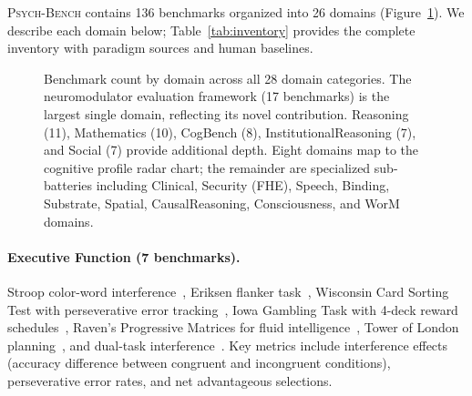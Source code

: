 \documentclass[11pt,letterpaper]{article}
\newcommand{\psychbench}{\textsc{Psych-Bench}}
\begin{document}
\psychbench{} contains 136 benchmarks organized into 26 domains (Figure~\ref{fig:domain_matrix}). We describe each domain below; Table~\ref{tab:inventory} provides the complete inventory with paradigm sources and human baselines.

\begin{figure}[t]
\centering
{}
\caption{Benchmark count by domain across all 28 domain categories. The neuromodulator evaluation framework (17 benchmarks) is the largest single domain, reflecting its novel contribution. Reasoning (11), Mathematics (10), CogBench (8), InstitutionalReasoning (7), and Social (7) provide additional depth. Eight domains map to the cognitive profile radar chart; the remainder are specialized sub-batteries including Clinical, Security (FHE), Speech, Binding, Substrate, Spatial, CausalReasoning, Consciousness, and WorM domains.}
\label{fig:domain_matrix}
\end{figure}

\paragraph{Executive Function (7 benchmarks).} Stroop color-word interference~\citep{stroop1935interference,macleod1991half}, Eriksen flanker task~\citep{eriksen1974effects}, Wisconsin Card Sorting Test with perseverative error tracking~\citep{berg1948simple}, Iowa Gambling Task with 4-deck reward schedules~\citep{bechara1994insensitivity}, Raven's Progressive Matrices for fluid intelligence~\citep{raven1938progressive}, Tower of London planning~\citep{shallice1982specific}, and dual-task interference~\citep{pashler1994dual}. Key metrics include interference effects (accuracy difference between congruent and incongruent conditions), perseverative error rates, and net advantageous selections.
\end{document}
